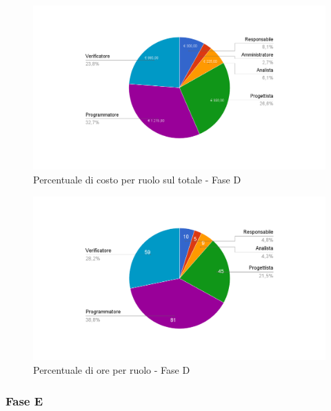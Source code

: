 			\begin{figure}[!h]
				\centering
				\includegraphics[height=6.3cm, width=11.4cm]{img/percSoldi/percSoldiPDC.png} 
				\caption{Percentuale di costo per ruolo sul totale - Fase D}
			\end{figure}
			
			
			\begin{figure}[!h]
				\centering
				\includegraphics[height=6.3cm, width=11.4cm]{img/percOre/PercentualeOreFasePDC.png} 
				\caption{Percentuale di ore per ruolo - Fase D}
			\end{figure}
			
			\newpage	
		
		\subsubsection{Fase E}	
